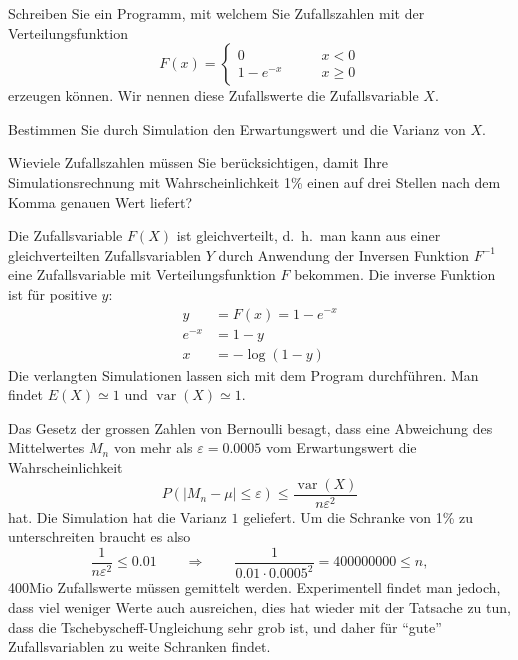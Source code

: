 Schreiben Sie ein Programm, mit welchem Sie Zufallszahlen mit der
Verteilungsfunktion
\[
F(x)=\begin{cases}
0&\qquad x< 0\\
1-e^{-x}&\qquad x\ge 0
\end{cases}
\]
erzeugen können. Wir nennen diese Zufallswerte die Zufallsvariable $X$.
\begin{teilaufgaben}
\item Bestimmen Sie durch Simulation den Erwartungswert und die Varianz
von $X$.
\item Wieviele Zufallszahlen müssen Sie berücksichtigen, damit Ihre
Simulationsrechnung mit Wahrscheinlichkeit 1\% einen auf drei Stellen
nach dem Komma genauen Wert liefert?
\end{teilaufgaben}


\begin{loesung}
\begin{teilaufgaben}
\item Die Zufallsvariable $F(X)$ ist gleichverteilt, d.~h.~man kann aus
einer gleichverteilten Zufallsvariablen $Y$ durch Anwendung der Inversen
Funktion $F^{-1}$ eine Zufallsvariable mit Verteilungsfunktion $F$ bekommen.
Die inverse Funktion ist für positive $y$:
\begin{align*}
y&=F(x)=1-e^{-x}\\
e^{-x}&=1-y\\
x&=-\log(1-y)
\end{align*}
Die verlangten Simulationen lassen sich mit dem Program
durchführen. Man findet $E(X)\simeq 1$ und $\operatorname{var}(X)\simeq 1$.
\item
Das Gesetz der grossen Zahlen von Bernoulli besagt, dass 
eine Abweichung des Mittelwertes $M_n$ von mehr als $\varepsilon= 0.0005$
vom Erwartungswert die Wahrscheinlichkeit
\[
P(|M_n-\mu| \le \varepsilon)\le \frac{\operatorname{var}(X)}{n\varepsilon^2}
\]
hat. Die Simulation hat die Varianz $1$ geliefert.
Um die Schranke von 1\% zu unterschreiten braucht es also
\[
\frac1{n\varepsilon^2}\le 0.01
\qquad\Rightarrow\qquad
\frac1{0.01\cdot 0.0005^2}=400000000\le n,
\]
400Mio Zufallswerte müssen gemittelt werden. Experimentell findet man
jedoch, dass viel weniger Werte auch ausreichen, dies hat wieder mit der
Tatsache zu tun, dass die Tschebyscheff-Ungleichung sehr grob ist, und
daher für ``gute'' Zufallsvariablen zu weite Schranken findet.
\qedhere
\end{teilaufgaben}
\end{loesung}

